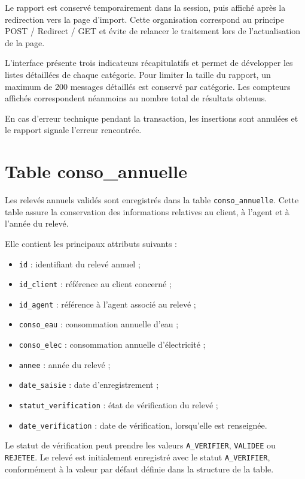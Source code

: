 Le rapport est conservé temporairement dans la session, puis affiché après la redirection vers la page d'import. Cette organisation correspond au principe POST / Redirect / GET et évite de relancer le traitement lors de l'actualisation de la page.

L'interface présente trois indicateurs récapitulatifs et permet de développer les listes détaillées de chaque catégorie. Pour limiter la taille du rapport, un maximum de 200 messages détaillés est conservé par catégorie. Les compteurs affichés correspondent néanmoins au nombre total de résultats obtenus.

En cas d'erreur technique pendant la transaction, les insertions sont annulées et le rapport signale l'erreur rencontrée.

\section{Table conso\_annuelle}

Les relevés annuels validés sont enregistrés dans la table \texttt{conso\_annuelle}. Cette table assure la conservation des informations relatives au client, à l'agent et à l'année du relevé.

Elle contient les principaux attributs suivants :

\begin{itemize}
    \item \texttt{id} : identifiant du relevé annuel ;
    \item \texttt{id\_client} : référence au client concerné ;
    \item \texttt{id\_agent} : référence à l'agent associé au relevé ;
    \item \texttt{conso\_eau} : consommation annuelle d'eau ;
    \item \texttt{conso\_elec} : consommation annuelle d'électricité ;
    \item \texttt{annee} : année du relevé ;
    \item \texttt{date\_saisie} : date d'enregistrement ;
    \item \texttt{statut\_verification} : état de vérification du relevé ;
    \item \texttt{date\_verification} : date de vérification, lorsqu'elle est renseignée.
\end{itemize}

Le statut de vérification peut prendre les valeurs \texttt{A\_VERIFIER}, \texttt{VALIDEE} ou \texttt{REJETEE}. Le relevé est initialement enregistré avec le statut \texttt{A\_VERIFIER}, conformément à la valeur par défaut définie dans la structure de la table.


